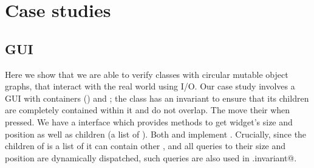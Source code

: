 \saveSpace
\section{Case studies}
\label{s:patterns}
\saveSpace

%
%
%
%
%
%
%
\subsection{GUI}
Here we show that we are able to verify classes with circular mutable object graphs, that interact with the real world using I/O.
Our case study involves a GUI with containers (\Q@SafeMovable@s) and \Q@Button@s;
the \Q@SafeMovable@ class has an invariant to ensure that its children are completely contained within it and do not overlap. The \Q@Button@s move their \Q@SafeMovable@ when pressed. We have a \Q@Widget@ interface which provides methods to get widget's size and position as well as children (a list of \Q@Widget@s). Both \Q@SafeMovable@s and \Q@Button@s implement \Q@Widget@. Crucially, since the children of \Q@SafeMovable@ is a list of \Q@Widget@s it can contain other \Q@SafeMovable@s, and all queries to their size and position are dynamically dispatched, such queries are also used in \Q@SafeMovable.invariant@.


